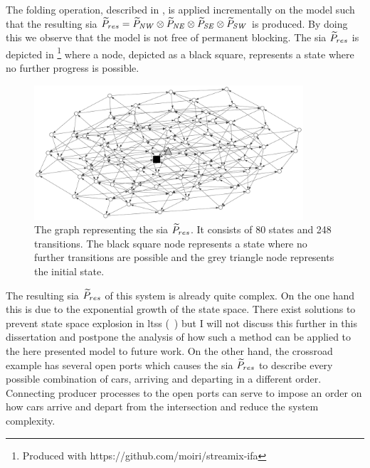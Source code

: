The folding operation, described in \Sect{\ref{sect_sia_composition}}, is applied incrementally on the model such that the resulting \gls{sia} $\widetilde{P}_{res} = \widetilde{P}_{\mathit{NW}} \otimes \widetilde{P}_{\mathit{NE}} \otimes \widetilde{P}_{\mathit{SE}} \otimes \widetilde{P}_{\mathit{SW}}$ is produced.
By doing this we observe that the model is not free of permanent blocking.
The \gls{sia} $\widetilde{P}_{res}$ is depicted in \Fig{\ref{fig_cross_sia_dl}}\footnote{Produced with https://github.com/moiri/streamix-ifa} where a node, depicted as a black square, represents a state where no further progress is possible.
\begin{figure}[bht]
    \TopFigSpace
    \centering
    \includegraphics[width=10cm]{fig/cross_sia_dl.pdf}
    \CaptionFigSpace
    \caption{The graph representing the \gls{sia} $\widetilde{P}_{res}$.
        It consists of 80 states and 248 transitions.
        The black square node represents a state where no further transitions are possible and the grey triangle node represents the initial state.}
    \label{fig_cross_sia_dl}
    \BotFigSpace
\end{figure}
The resulting \gls{sia} $\widetilde{P}_{res}$ of this system is already quite complex.
On the one hand this is due to the exponential growth of the state space.
There exist solutions to prevent state space explosion in \glspl{lts} (\eg~\cite{groote1996}) but I will not discuss this further in this dissertation and postpone the analysis of how such a method can be applied to the here presented model to future work.
On the other hand, the crossroad example has several open ports which causes the \gls{sia} $\widetilde{P}_{res}$ to describe every possible combination of cars, arriving and departing in a different order.
Connecting producer processes to the open ports can serve to impose an order on how cars arrive and depart from the intersection and reduce the system complexity.

